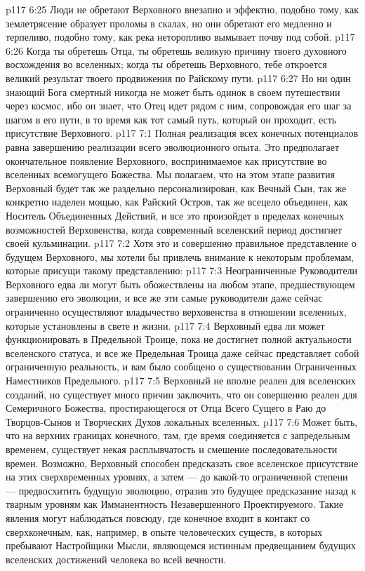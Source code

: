 \vs p117 6:25 \pc Люди не обретают Верховного внезапно и эффектно, подобно тому, как землетрясение образует проломы в скалах, но они обретают его медленно и терпеливо, подобно тому, как река неторопливо вымывает почву под собой.
\vs p117 6:26 Когда ты обретешь Отца, ты обретешь великую причину твоего духовного восхождения во вселенных; когда ты обретешь Верховного, тебе откроется великий результат твоего продвижения по Райскому пути.
\vs p117 6:27 Но ни один знающий Бога смертный никогда не может быть одинок в своем путешествии через космос, ибо он знает, что Отец идет рядом с ним, сопровождая его шаг за шагом в его пути, в то время как тот самый путь, который он проходит, есть присутствие Верховного.
\vs p117 7:1 Полная реализация всех конечных потенциалов равна завершению реализации всего эволюционного опыта. Это предполагает окончательное появление Верховного, воспринимаемое как присутствие во вселенных всемогущего Божества. Мы полагаем, что на этом этапе развития Верховный будет так же раздельно персонализирован, как Вечный Сын, так же конкретно наделен мощью, как Райский Остров, так же всецело объединен, как Носитель Объединенных Действий, и все это произойдет в пределах конечных возможностей Верховенства, когда современный вселенский период достигнет своей кульминации.
\vs p117 7:2 Хотя это и совершенно правильное представление о будущем Верховного, мы хотели бы привлечь внимание к некоторым проблемам, которые присущи такому представлению:
\vs p117 7:3 \bibnobreakspace Неограниченные Руководители Верховного едва ли могут быть обожествлены на любом этапе, предшествующем завершению его эволюции, и все же эти самые руководители даже сейчас ограниченно осуществляют владычество верховенства в отношении вселенных, которые установлены в свете и жизни.
\vs p117 7:4 \pc {}\bibnobreakspace Верховный едва ли может функционировать в Предельной Троице, пока не достигнет полной актуальности вселенского статуса, и все же Предельная Троица даже сейчас представляет собой ограниченную реальность, и вам было сообщено о существовании Ограниченных Наместников Предельного.
\vs p117 7:5 \pc {}\bibnobreakspace Верховный не вполне реален для вселенских созданий, но существует много причин заключить, что он совершенно реален для Семеричного Божества, простирающегося от Отца Всего Сущего в Раю до Творцов\hyp{}Сынов и Творческих Духов локальных вселенных.
\vs p117 7:6 \pc Может быть, что на верхних границах конечного, там, где время соединяется с запредельным временем, существует некая расплывчатость и смешение последовательности времен. Возможно, Верховный способен предсказать свое вселенское присутствие на этих сверхвременных уровнях, а затем --- до какой\hyp{}то ограниченной степени --- предвосхитить будущую эволюцию, отразив это будущее предсказание назад к тварным уровням как Имманентность Незавершенного Проектируемого. Такие явления могут наблюдаться повсюду, где конечное входит в контакт со сверхконечным, как, например, в опыте человеческих существ, в которых пребывают Настройщики Мысли, являющемся истинным предвещанием будущих вселенских достижений человека во всей вечности.
